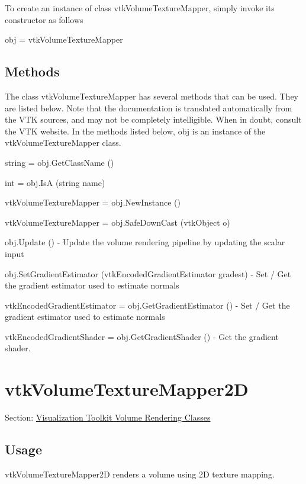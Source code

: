 To create an instance of class vtk\-Volume\-Texture\-Mapper, simply invoke its constructor as follows \begin{DoxyVerb}  obj = vtkVolumeTextureMapper
\end{DoxyVerb}
 \hypertarget{vtkwidgets_vtkxyplotwidget_Methods}{}\subsection{Methods}\label{vtkwidgets_vtkxyplotwidget_Methods}
The class vtk\-Volume\-Texture\-Mapper has several methods that can be used. They are listed below. Note that the documentation is translated automatically from the V\-T\-K sources, and may not be completely intelligible. When in doubt, consult the V\-T\-K website. In the methods listed below, {\ttfamily obj} is an instance of the vtk\-Volume\-Texture\-Mapper class. 
\begin{DoxyItemize}
\item {\ttfamily string = obj.\-Get\-Class\-Name ()}  
\item {\ttfamily int = obj.\-Is\-A (string name)}  
\item {\ttfamily vtk\-Volume\-Texture\-Mapper = obj.\-New\-Instance ()}  
\item {\ttfamily vtk\-Volume\-Texture\-Mapper = obj.\-Safe\-Down\-Cast (vtk\-Object o)}  
\item {\ttfamily obj.\-Update ()} -\/ Update the volume rendering pipeline by updating the scalar input  
\item {\ttfamily obj.\-Set\-Gradient\-Estimator (vtk\-Encoded\-Gradient\-Estimator gradest)} -\/ Set / Get the gradient estimator used to estimate normals  
\item {\ttfamily vtk\-Encoded\-Gradient\-Estimator = obj.\-Get\-Gradient\-Estimator ()} -\/ Set / Get the gradient estimator used to estimate normals  
\item {\ttfamily vtk\-Encoded\-Gradient\-Shader = obj.\-Get\-Gradient\-Shader ()} -\/ Get the gradient shader.  
\end{DoxyItemize}\hypertarget{vtkvolumerendering_vtkvolumetexturemapper2d}{}\section{vtk\-Volume\-Texture\-Mapper2\-D}\label{vtkvolumerendering_vtkvolumetexturemapper2d}
Section\-: \hyperlink{sec_vtkvolumerendering}{Visualization Toolkit Volume Rendering Classes} \hypertarget{vtkwidgets_vtkxyplotwidget_Usage}{}\subsection{Usage}\label{vtkwidgets_vtkxyplotwidget_Usage}
vtk\-Volume\-Texture\-Mapper2\-D renders a volume using 2\-D texture mapping.


